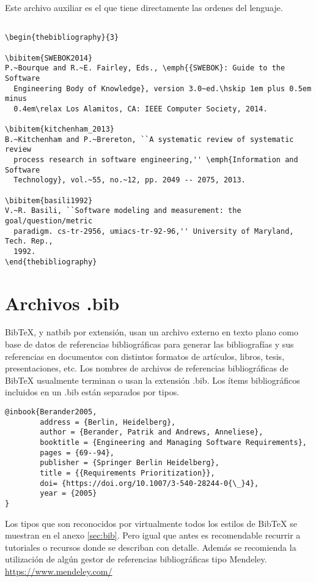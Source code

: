   Este archivo auxiliar es el que tiene directamente las ordenes del lenguaje.
  
 \begin{verbatim}
  
\begin{thebibliography}{3}

\bibitem{SWEBOK2014}
P.~Bourque and R.~E. Fairley, Eds., \emph{{SWEBOK}: Guide to the Software
  Engineering Body of Knowledge}, version 3.0~ed.\hskip 1em plus 0.5em minus
  0.4em\relax Los Alamitos, CA: IEEE Computer Society, 2014.

\bibitem{kitchenham_2013}
B.~Kitchenham and P.~Brereton, ``A systematic review of systematic review
  process research in software engineering,'' \emph{Information and Software
  Technology}, vol.~55, no.~12, pp. 2049 -- 2075, 2013.

\bibitem{basili1992}
V.~R. Basili, ``Software modeling and measurement: the goal/question/metric
  paradigm. cs-tr-2956, umiacs-tr-92-96,'' University of Maryland, Tech. Rep.,
  1992.
\end{thebibliography}

  \end{verbatim}
 
 
 
 \section{Archivos .bib}
 
 BibTeX, y natbib por extensión, usan un archivo externo en texto plano como base de datos de referencias bibliográficas para generar las bibliografías y sus referencias en documentos con distintos formatos de artículos, libros, tesis, presentaciones, etc. Los nombres de archivos de referencias bibliográficas de BibTeX usualmente terminan o usan la extensión .bib. Los ítems bibliográficos incluidos en un .bib están separados por tipos.
 
 \begin{verbatim}
@inbook{Berander2005,
        address = {Berlin, Heidelberg},
        author = {Berander, Patrik and Andrews, Anneliese},
        booktitle = {Engineering and Managing Software Requirements},
        pages = {69--94},
        publisher = {Springer Berlin Heidelberg},
        title = {{Requirements Prioritization}},
        doi= {https://doi.org/10.1007/3-540-28244-0{\_}4},
        year = {2005}
} 
 \end{verbatim}
 
 Los tipos que son reconocidos por virtualmente todos los estilos de BibTeX se muestran en el anexo \ref{sec:bib}. Pero igual que antes es recomendable recurrir a tutoriales o recursos donde se describan con detalle. Además se recomienda la utilización de algún gestor de referencias bibliográficas tipo Mendeley. \url{https://www.mendeley.com/}